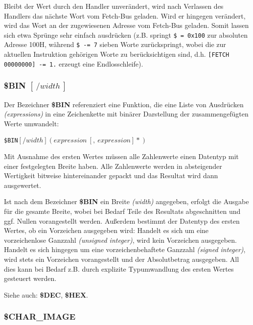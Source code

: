 \documentclass{scrartcl}
\begin{document}
\vspace{10pt}
\noindent Bleibt der Wert durch den Handler unverändert, wird nach Verlassen des Handlers das nächste Wort vom Fetch-Bus geladen. Wird er hingegen verändert, wird das Wort an der zugewiesenen Adresse vom Fetch-Bus geladen. Somit lassen sich etwa Sprünge sehr einfach ausdrücken (z.B. springt \texttt{\$~=~0x100} zur absoluten Adresse 100H, während \texttt{\$~-=~7} sieben Worte zurückspringt, wobei die zur aktuellen Instruktion gehörigen Worte zu berücksichtigen sind, d.h. \texttt{[FETCH 00000000]~-=~1.} erzeugt eine Endlosschleife).

\subsubsection{\$BIN $[~/width~]$}

\noindent Der Bezeichner \textbf{\$BIN} referenziert eine Funktion, die eine Liste von Ausdrücken \textit{(expressions)} in eine Zeichenkette mit binärer Darstellung der zusammengefügten Werte umwandelt:

\vspace{10pt}
\texttt{\$BIN$[/width](expression~[,~expression]*)$}

\vspace{10pt}
\noindent Mit Ausnahme des ersten Wertes müssen alle Zahlenwerte einen Datentyp mit einer festgelegten Breite haben. Alle Zahlenwerte werden in absteigender Wertigkeit bitweise hintereinander gepackt und das Resultat wird dann ausgewertet.

\vspace{10pt}
\noindent Ist nach dem Bezeichner \textbf{\$BIN} ein Breite \textit{(width)} angegeben, erfolgt die Ausgabe für die gesamte Breite, wobei bei Bedarf Teile des Resultats abgeschnitten und ggf. Nullen vorangestellt werden. Außerdem bestimmt der Datentyp des ersten Wertes, ob ein Vorzeichen ausgegeben wird: Handelt es sich um eine vorzeichenlose Ganzzahl \textit{(unsigned integer)}, wird kein Vorzeichen ausgegeben. Handelt es sich hingegen um eine vorzeichenbehaftete Ganzzahl \textit{(signed integer)}, wird stets ein Vorzeichen vorangestellt und der Absolutbetrag ausgegeben. All dies kann bei Bedarf z.B. durch explizite Typumwandlung des ersten Wertes gesteuert werden.

\vspace{10pt}
\noindent Siehe auch: \textbf{\$DEC}, \textbf{\$HEX}.

\subsubsection{\$CHAR\_IMAGE}
\end{document}
